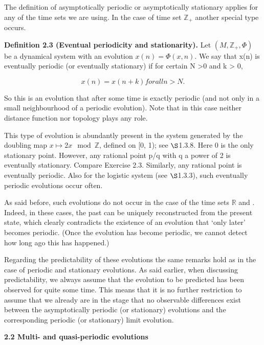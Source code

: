 \documentclass{article}
\begin{document}
\hfill

The definition of asymptotically periodic or asymptotically stationary applies for
any of the time sets we are using. In the case of time set $\mathbb{Z}_{+}$ another special type
occurs.

\hfill

\textbf{Definition 2.3 (Eventual periodicity and stationarity).} Let $(M, \mathbb{Z}_{+}, \Phi)$ be a
dynamical system with an evolution $x(n) = \Phi(x,n)$. We say that x(n) is eventually
periodic (or eventually stationary) if for certain N >0 and k > 0,

\[
x(n) = x(n+k) for all n > N.
\]

So this is an evolution that after some time is exactly periodic (and not only in a
small neighbourhood of a periodic evolution). Note that in this case neither distance
function nor topology plays any role.

\hfill

This type of evolution is abundantly present in the system generated by the doubling
map $x \mapsto 2x \mod \mathbb{Z}$, defined on [0, 1); see $\S$1.3.8. Here 0 is the only stationary
point. However, any rational point p/q with q a power of 2 is eventually stationary.
Compare Exercise 2.3. Similarly, any rational point is eventually periodic. Also for
the logistic system (see $\S$1.3.3), such eventually periodic evolutions occur often.

\hfill

As said before, such evolutions do not occur in the case of the time sets $\mathbb{R}$ and .
Indeed, in these cases, the past can be uniquely reconstructed from the present state,
which clearly contradicts the existence of an evolution that ‘only later’ becomes
periodic. (Once the evolution has become periodic, we cannot detect how long ago
this has happened.)

\hfill

Regarding the predictability of these evolutions the same remarks hold as in
the case of periodic and stationary evolutions. As said earlier, when discussing
predictability, we always assume that the evolution to be predicted has been observed
for quite some time. This means that it is no further restriction to assume
that we already are in the stage that no observable differences exist between the
asymptotically periodic (or stationary) evolutions and the corresponding periodic
(or stationary) limit evolution.

\hfill

\textbf{2.2 Multi- and quasi-periodic evolutions}
\end{document}
